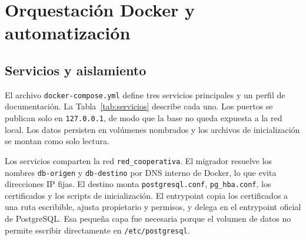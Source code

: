 \section{Orquestación Docker y automatización}

\subsection{Servicios y aislamiento}

El archivo \texttt{docker-compose.yml} define tres servicios principales y un
perfil de documentación. La Tabla~\ref{tab:servicios} describe cada uno. Los
puertos se publican solo en \texttt{127.0.0.1}, de modo que la base no queda
expuesta a la red local. Los datos persisten en volúmenes nombrados y los
archivos de inicialización se montan como solo lectura.

\begin{table}[H]
  \centering
  \caption{Servicios de Docker Compose}
  \label{tab:servicios}
\end{table}

Los servicios comparten la red \texttt{red\_cooperativa}. El migrador resuelve
los nombres \texttt{db-origen} y \texttt{db-destino} por DNS interno de
Docker, lo que evita direcciones IP fijas. El destino monta
\texttt{postgresql.conf}, \texttt{pg\_hba.conf}, los certificados y los scripts
de inicialización. El entrypoint copia los certificados a una ruta escribible,
ajusta propietario y permisos, y delega en el entrypoint oficial de
PostgreSQL. Esa pequeña capa fue necesaria porque el volumen de datos no
permite escribir directamente en \texttt{/etc/postgresql}.

